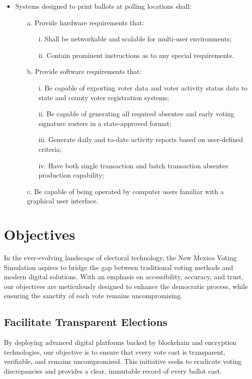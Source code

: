 \documentclass{article}
\begin{document}
\begin{itemize}
    \item Systems designed to print ballots at polling locations shall:
    \begin{itemize}
        \item[a.] Provide hardware requirements that:
        \begin{itemize}
            \item[i.] Shall be networkable and scalable for multi-user environments;
            \item[ii.] Contain prominent instructions as to any special requirements.
        \end{itemize}
        \item[b.] Provide software requirements that:
        \begin{itemize}
            \item[i.] Be capable of exporting voter data and voter activity status data to state and county voter registration systems;
            \item[ii.] Be capable of generating all required absentee and early voting signature rosters in a state-approved format;
            \item[iii.] Generate daily and to-date activity reports based on user-defined criteria;
            \item[iv.] Have both single transaction and batch transaction absentee production capability;
        \end{itemize}
        \item[c.] Be capable of being operated by computer users familiar with a graphical user interface.
    \end{itemize}
\end{itemize}

\section{Objectives}
In the ever-evolving landscape of electoral technology, the New Mexico Voting Simulation aspires to bridge the gap between traditional voting methods and modern digital solutions. With an emphasis on accessibility, accuracy, and trust, our objectives are meticulously designed to enhance the democratic process, while ensuring the sanctity of each vote remains uncompromising.

\subsection{Facilitate Transparent Elections}
By deploying advanced digital platforms backed by blockchain and encryption technologies, our objective is to ensure that every vote cast is transparent, verifiable, and remains uncompromised. This initiative seeks to eradicate voting discrepancies and provides a clear, immutable record of every ballot cast.
\end{document}
